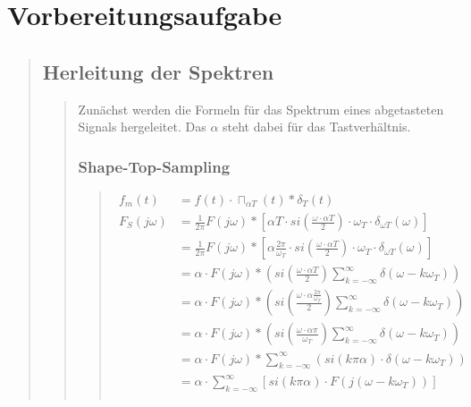 \section{Vorbereitungsaufgabe}
\begin{quote}
    \subsection{Herleitung der Spektren}
    \begin{quote}
        Zunächst werden die Formeln für das Spektrum eines abgetasteten Signals
        hergeleitet. Das $\alpha$ steht dabei für das Tastverhältnis.
        
        \subsubsection{Shape-Top-Sampling}
        \begin{quote}
            \begin{equation*}
                \begin{split}
                    f_m (t)   &= f(t) \cdot \sqcap_{\alpha T} (t) \ast \delta_T (t) \\
                    F_S (j\omega) &= \frac{1}{2\pi} F (j\omega) \ast \left [
                    \alpha T \cdot si \left( \frac{\omega \cdot \alpha T}{2} \right) \cdot \omega_T \cdot \delta_{\omega
                    T} (\omega) \right] \\
                    &= \frac{1}{2\pi} F (j\omega) \ast \left [
                    \alpha \frac{2 \pi}{\omega_T} \cdot si \left( \frac{\omega \cdot \alpha T}{2} \right) \cdot \omega_T
                    \cdot \delta_{\omega T} (\omega) \right] \\
                    &= \alpha \cdot F (j \omega) \ast \left ( si \left( \frac{\omega \cdot \alpha T}{2} \right)
                    \sum_{k=-\infty}^{\infty} \delta (\omega - k\omega_T) \right)\\
                    &= \alpha \cdot F (j \omega) \ast \left ( si \left( \frac{\omega \cdot \alpha \frac{2
                    \pi}{\omega_T}}{2} \right) \sum_{k=-\infty}^{\infty} \delta (\omega - k\omega_T) \right)\\
                    &= \alpha \cdot F (j \omega) \ast \left ( si \left( \frac{\omega \cdot \alpha \pi}{\omega_T}
                    \right) \sum_{k=-\infty}^{\infty} \delta (\omega - k\omega_T) \right)\\
                    &= \alpha \cdot F (j \omega) \ast \sum_{k=-\infty}^{\infty} (si(k \pi \alpha) \cdot \delta (\omega -
                    k\omega_T))\\
                    &= \alpha \cdot \sum_{k=-\infty}^{\infty} \left [ si(k \pi \alpha) \cdot F (j(\omega - k\omega_T))
                    \right]\\
                \end{split}
            \end{equation*}
        \end{quote} %
        

\end{quote}
\end{quote}
